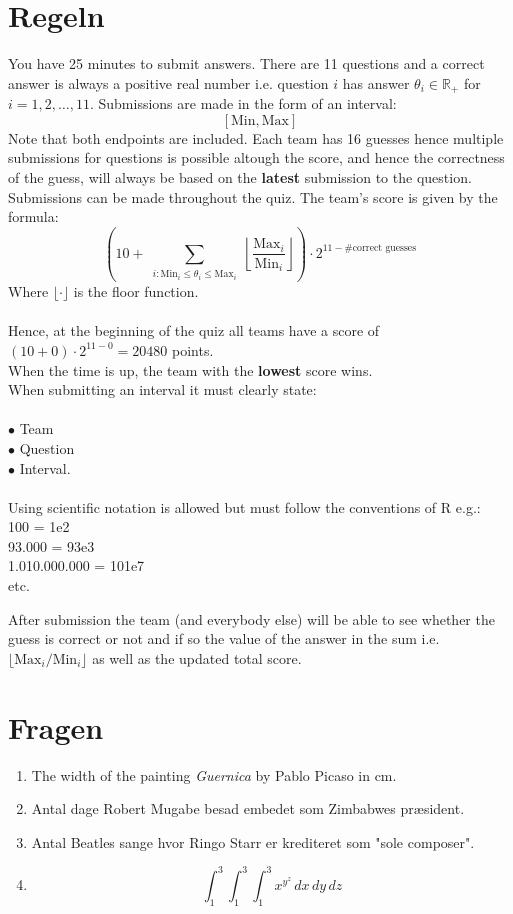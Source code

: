 \documentclass[10pt,a4paper]{article}
\begin{document}
 
\section*{Regeln}
You have 25 minutes to submit answers. There are 11 questions and a correct answer is always a positive real number i.e. question $i$ has answer $\theta_i \in \mathbb{R}_+$ for $i = 1,2,\ldots,11$. Submissions are made in the form of an interval:
$$
[\text{Min}, \text{Max}]
$$
Note that both endpoints are included. Each team has 16 guesses hence multiple submissions for questions is possible altough the score, and hence the correctness of the guess, will always be based on the \textbf{latest} submission to the question.
Submissions can be made throughout the quiz. 
The team's score is given by the formula:
$$
\left( 10 + \sum_{\substack{i : \text{Min}_i \leq \theta_i \leq \text{Max}_i}} \left\lfloor \frac{\text{Max}_i}{\text{Min}_i} \right\rfloor \right) \cdot 2^{11 - \# \text{correct guesses} }
$$
Where $\lfloor \cdot \rfloor$ is the floor function.\\ \\
Hence, at the beginning of the quiz all teams have a score of
$(10 + 0)\cdot 2^{11-0} = 20480$ points. \\
When the time is up, the team with the \textbf{lowest} score wins.\\
When submitting an interval it must clearly state:\\ \\
$\bullet$ Team\\
$\bullet$ Question\\
$\bullet$ Interval. \\ \\
Using scientific notation is allowed but must follow the conventions of R e.g.:\\
100 = 1e2 \\
93.000 = 93e3 \\
1.010.000.000 = 101e7 \\
etc.

After submission the team (and everybody else) will be able to see whether the guess is correct or not and if so the value of the answer in the sum i.e. $\lfloor \text{Max}_i / \text{Min}_i \rfloor$ as well as the updated total score.

\newpage
\section*{Fragen}
\begin{enumerate}
  \item The width of the painting \textit{Guernica} by Pablo Picaso in cm.
  
 \item Antal dage Robert Mugabe besad embedet som Zimbabwes præsident.

  \item Antal Beatles sange hvor Ringo Starr er krediteret som "sole composer".

  \item 
  $$
  \int_{1}^{3}\int_{1}^{3}\int_{1}^{3} x^{y^z}\,dx\,dy\,dz
  $$ 
 

\end{enumerate}
\end{document}
